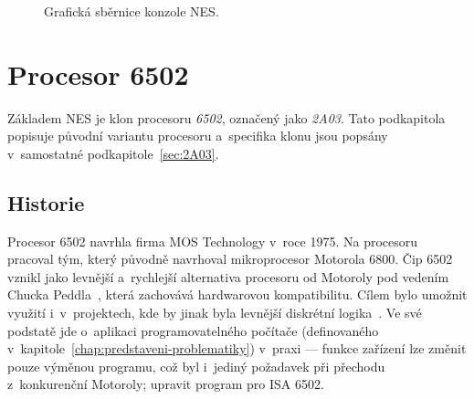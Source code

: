 \begin{figure}[ht!]
	\centering
	\caption{Grafická sběrnice konzole NES.}\label{fig:nes-grafickasbernice}
\end{figure}

\section{Procesor 6502}
Základem NES je klon procesoru \emph{6502}, označený jako \emph{2A03}. Tato podkapitola popisuje původní variantu procesoru a~specifika klonu jsou popsány v~samostatné podkapitole~\ref{sec:2A03}.

\subsection{Historie}
Procesor 6502 navrhla firma MOS Technology v~roce 1975. Na procesoru pracoval tým, který původně navrhoval mikroprocesor Motorola 6800. Čip 6502 vznikl jako levnější a~rychlejší alternativa procesoru od Motoroly pod vedením Chucka Peddla~\cite{computer-history-museum:chuck-peddle}, která zachovává hardwarovou kompatibilitu. Cílem bylo umožnit využití i~v~projektech, kde by jinak byla levnější diskrétní logika~\cite{mos:hw-manual}. Ve své podstatě jde o~aplikaci programovatelného počítače (definovaného v~kapitole~\ref{chap:predstaveni-problematiky}) v~praxi --- funkce zařízení lze změnit pouze výměnou programu, což byl i~jediný požadavek při přechodu z~konkurenční Motoroly; upravit program pro ISA 6502.

